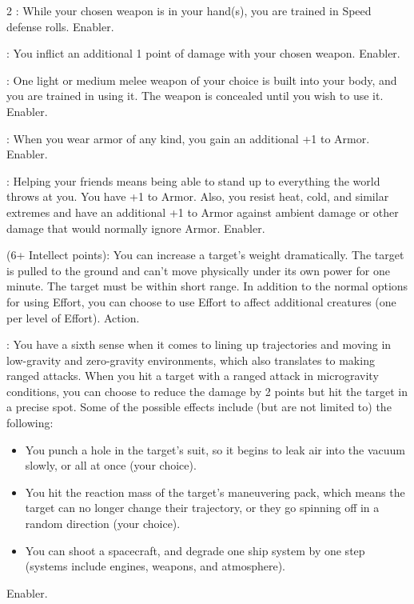 \begin{multicols}{2}
: While your chosen weapon is in your hand(s), you are trained in Speed defense rolls. Enabler. 
 
: You inflict an additional 1 point of damage with your chosen weapon. Enabler. 
 
: One light or medium melee weapon of your choice is built into your body, and you are trained in using it. The weapon is concealed until you wish to use it. Enabler. 
 
: When you wear armor of any kind, you gain an additional +1 to Armor. Enabler. 
 
: Helping your friends means being able to stand up to everything the world throws at you. You have +1 to Armor. Also, you resist heat, cold, and similar extremes and have an additional +1 to Armor against ambient damage or other damage that would normally ignore Armor. Enabler.
 
 (6+ Intellect points): You can increase a target’s weight dramatically. The target is pulled to the ground and can’t move physically under its own power for one minute. The target must be within short range. In addition to the normal options for using Effort, you can choose to use Effort to affect additional creatures (one per level of Effort). Action. 
 
: You have a sixth sense when it comes to lining up trajectories and moving in low-gravity and zero-gravity environments, which also translates to making ranged attacks. When you hit a target with a ranged attack in microgravity conditions, you can choose to reduce the damage by 2 points but hit the target in a precise spot. Some of the possible effects include (but are not limited to) the following: 
\begin{itemize} 
\item You punch a hole in the target’s suit, so it begins to leak air into the vacuum slowly, or all at once (your choice). 
\item You hit the reaction mass of the target’s maneuvering pack, which means the target can no longer change their trajectory, or they go spinning off in a random direction (your choice). 
\item You can shoot a spacecraft, and degrade one ship system by one step (systems include engines, weapons, and atmosphere). 
\end{itemize}
Enabler. 
 

\end{multicols}
